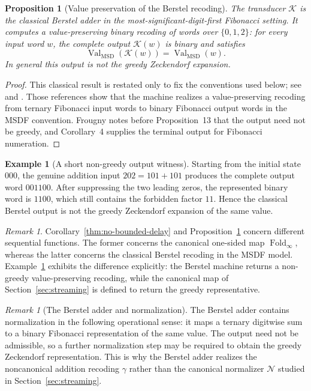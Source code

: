 \documentclass[11pt,letterpaper]{article}
\numberwithin{equation}{section}
\theoremstyle{plain}
\newtheorem{proposition}[theorem]{Proposition}
\theoremstyle{definition}
\newtheorem{example}[theorem]{Example}
\theoremstyle{remark}
\newtheorem{remark}[theorem]{Remark}
\DeclareMathOperator{\Val}{Val}
\DeclareMathOperator{\Fold}{Fold}
\begin{document}
\begin{proposition}[Value preservation of the Berstel recoding]\label{prop:classical-berstel-correctness}
The transducer $\mathcal K$ is the classical Berstel adder in the
most-significant-digit-first Fibonacci setting.  It computes a value-preserving
binary recoding of words over $\{0,1,2\}$: for every input word $w$, the
complete output $\mathcal K(w)$ is binary and satisfies
\[
\Val_{\mathrm{MSD}}(\mathcal K(w))=\Val_{\mathrm{MSD}}(w).
\]
In general this output is not the greedy Zeckendorf expansion.
\end{proposition}

\begin{proof}
This classical result is restated only to fix the conventions used below; see
\cite[Cor.~4]{Frougny1999OnlineAddition} and
\cite[Thm.~3.1]{LabbeLepsova2023FibonacciTwosComplement}.  Those references
show that the machine realizes a value-preserving recoding from ternary
Fibonacci input words to binary Fibonacci output words in the MSDF convention.
Frougny notes before Proposition~13 that the output need not be greedy, and
Corollary~4 supplies the terminal output for Fibonacci numeration.
\end{proof}

\begin{example}[A short non-greedy output witness]\label{ex:berstel-nongreedy}
Starting from the initial state $000$, the genuine addition input
$202=101+101$ produces the
complete output word $001100$.  After suppressing the two leading zeros, the
represented binary word is $1100$, which still contains the forbidden factor
$11$.  Hence the classical Berstel output is not the greedy Zeckendorf
expansion of the same value.
\end{example}

\begin{remark}
Corollary~\ref{thm:no-bounded-delay} and
Proposition~\ref{prop:classical-berstel-correctness} concern different
sequential functions.  The former concerns the canonical one-sided map
$\Fold_\infty$, whereas the latter concerns the classical Berstel recoding in
the MSDF model.  Example~\ref{ex:berstel-nongreedy}
exhibits the difference
explicitly: the Berstel machine returns a non-greedy value-preserving recoding,
while the canonical map of Section~\ref{sec:streaming} is defined to return the greedy
representative.
\end{remark}

\begin{remark}[The Berstel adder and normalization]\label{rem:berstel-contains-normalizer}
The Berstel adder contains normalization in the following operational sense:
it maps a ternary digitwise sum to a binary Fibonacci representation of the
same value.  The output need not be admissible, so a further normalization
step may be required to obtain the greedy Zeckendorf representation.  This is
why the Berstel adder realizes the noncanonical addition recoding $\gamma$
rather than the canonical normalizer $\mathcal N$ studied in
Section~\ref{sec:streaming}.
\end{remark}
\end{document}
